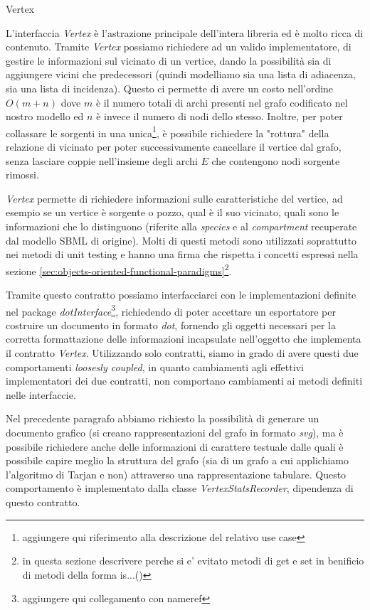 \begin{paragraph}{Vertex}

  L'interfaccia \emph{Vertex} \`e l'astrazione principale dell'intera
  libreria ed \`e molto ricca di contenuto.  Tramite \emph{Vertex}
  possiamo richiedere ad un valido implementatore, di gestire le
  informazioni sul vicinato di un vertice, dando la possibilit\`a sia
  di aggiungere vicini che predecessori (quindi modelliamo sia una
  lista di adiacenza, sia una lista di incidenza). Questo ci permette
  di avere un costo nell'ordine $O(m + n)$ dove $m$ \`e il numero
  totali di archi presenti nel grafo codificato nel nostro modello ed
  $n$ \`e invece il numero di nodi dello stesso. Inoltre, per poter
  collassare le sorgenti in una unica\footnote{aggiungere qui
    riferimento alla descrizione del relativo use case}, \`e possibile
  richiedere la "rottura" della relazione di vicinato per poter
  successivamente cancellare il vertice dal grafo, senza lasciare
  coppie nell'insieme degli archi $E$ che contengono nodi sorgente
  rimossi.

  \emph{Vertex} permette di richiedere informazioni sulle
  caratteristiche del vertice, ad esempio se un vertice \`e sorgente o
  pozzo, qual \`e il suo vicinato, quali sono le informazioni che lo
  distinguono (riferite alla \emph{species} e al \emph{compartment}
  recuperate dal modello SBML di origine). Molti di questi metodi sono
  utilizzati soprattutto nei metodi di unit testing e hanno una firma
  che rispetta i concetti espressi nella sezione
  \ref{sec:objects-oriented-functional-paradigms}\footnote{in questa
    sezione descrivere perche si e' evitato metodi di get e set in
    benificio di metodi della forma is...()}.

  Tramite questo contratto possiamo interfacciarci con le
  implementazioni definite nel package
  \emph{dotInterface}\footnote{aggiungere qui collegamento con
    nameref}, richiedendo di poter accettare un esportatore per
  costruire un documento in formato \emph{dot}, fornendo gli oggetti
  necessari per la corretta formattazione delle informazioni
  incapsulate nell'oggetto che implementa il contratto
  \emph{Vertex}. Utilizzando solo contratti, siamo in grado di avere
  questi due comportamenti \emph{loosesly coupled}, in quanto
  cambiamenti agli effettivi implementatori dei due contratti, non
  comportano cambiamenti ai metodi definiti nelle interfaccie.

  Nel precedente paragrafo abbiamo richiesto la possibilit\`a di
  generare un documento grafico (si creano rappresentazioni del grafo
  in formato \emph{svg}), ma \`e possibile richiedere anche delle
  informazioni di carattere testuale dalle quali \`e possibile capire
  meglio la struttura del grafo (sia di un grafo a cui applichiamo
  l'algoritmo di Tarjan e non) attraverso una rappresentazione
  tabulare. Questo comportamento \`e implementato dalla classe
  \emph{VertexStatsRecorder}, dipendenza di questo contratto.


\end{paragraph}
